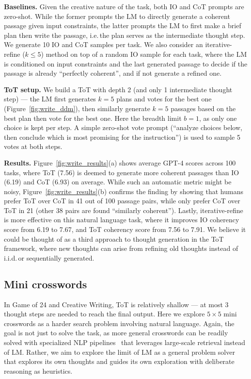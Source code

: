 \textbf{Baselines.} Given the creative nature of the task, both IO and CoT prompts are zero-shot. While the former prompts the LM to directly generate a coherent passage given input constraints, the latter prompts the LM to first make a brief plan then write the passage, i.e.\,the plan serves as the intermediate thought step. We generate 10 IO and CoT samples per task. We also consider an iterative-refine ($k\le 5$) method on top of a random IO sample for each task, where the LM is conditioned on input constraints and the last generated passage to decide if the passage is already ``perfectly coherent'', and if not generate a refined one.

\textbf{ToT setup.} We build a ToT with depth 2 (and only 1 intermediate thought step) ---  the LM first generates $k=5$ plans and votes for the best one (Figure~\ref{fig:write_ddm}), then similarly generate $k=5$ passages based on the best plan then vote for the best one. Here the breadth limit $b=1$, as only one choice is kept per step. A simple zero-shot vote prompt (``analyze choices below, then conclude which is most promising for the instruction'') is used to sample 5 votes at both steps. 

\textbf{Results.} Figure~\ref{fig:write_results}(a) shows average GPT-4 scores across 100 tasks, where ToT (7.56) is deemed to generate more coherent passages than IO (6.19) and CoT (6.93) on average. While such an automatic metric might be noisy, Figure~\ref{fig:write_results}(b) confirms the finding by showing that humans prefer ToT over CoT in 41 out of 100 passage pairs, while only prefer CoT over ToT in 21 (other 38 pairs are found ``similarly coherent''). Lastly, iterative-refine is more effective on this natural language task, where it improves IO coherency score from 6.19 to 7.67, and ToT coherency score from 7.56 to 7.91. We believe it could be thought of as a third approach to thought generation in the ToT framework, where new thoughts can arise from refining old thoughts instead of i.i.d.\,or sequentially generated.   

\subsection{Mini crosswords}

In Game of 24 and Creative Writing, ToT is relatively shallow --- at most 3 thought steps are needed to reach the final output. Here we explore $5\times 5$ mini crosswords as a harder search problem involving natural language. Again, the goal is not just to solve the task, as more general crosswords can be readily solved with specialized NLP pipelines~\citep{wallace2022automated} that leverages large-scale retrieval instead of LM. Rather, we aim to explore the limit of LM as a general problem solver that explores its own thoughts and guides its own exploration with deliberate reasoning as heuristics.

